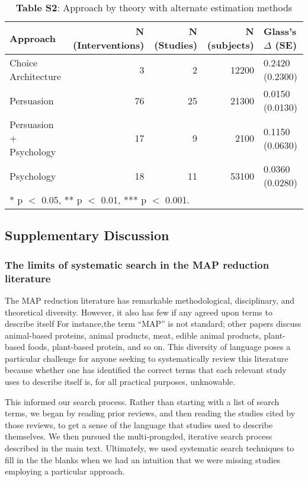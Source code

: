 \documentclass[sn-nature,pdflatex]{sn-jnl}
\begin{document}
\begin{table}[!h]
\centering
\caption{\label{tab:supp_table_two}\textbf{Table S2}: Approach by theory with alternate estimation methods }
\centering
\begin{tabular}[t]{lrrrl}
\toprule
Approach & N (Interventions) & N (Studies) & N (subjects) & Glass's $\Delta$ (SE)\\
\midrule
Choice Architecture & 3 & 2 & 12200 & 0.2420 (0.2300)\\
Persuasion & 76 & 25 & 21300 & 0.0150 (0.0130)\\
Persuasion + Psychology & 17 & 9 & 2100 & 0.1150 (0.0630)\\
Psychology & 18 & 11 & 53100 & 0.0360 (0.0280)\\
\bottomrule
\multicolumn{5}{l}{\rule{0pt}{1em}* p $<$ 0.05, ** p $<$ 0.01, *** p $<$ 0.001.}\\
\end{tabular}
\end{table}

\subsection{Supplementary Discussion}\label{supplementary-discussion}

\subsubsection{The limits of systematic search in the MAP reduction
literature}\label{the-limits-of-systematic-search-in-the-map-reduction-literature}

The MAP reduction literature has remarkable methodological,
disciplinary, and theoretical diversity. However, it also has few if any
agreed upon terms to describe itself For instance,the term ``MAP'' is
not standard; other papers discuss animal-based proteins, animal
products, meat, edible animal products, plant-based foods, plant-based
protein, and so on. This diversity of language poses a particular
challenge for anyone seeking to systematically review this literature
because whether one has identified the correct terms that each relevant
study uses to describe itself is, for all practical purposes,
unknowable.

This informed our search process. Rather than starting with a list of
search terms, we began by reading prior reviews, and then reading the
studies cited by those reviews, to get a sense of the language that
studies used to describe themselves. We then pursued the multi-prongded,
iterative search process described in the main text. Ultimately, we used
systematic search techniques to fill in the the blanks when we had an
intuition that we were missing studies employing a particular approach.
\end{document}
